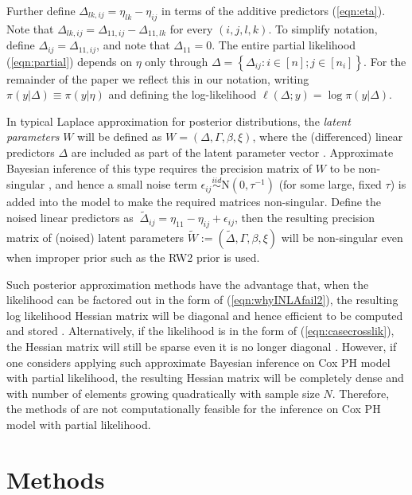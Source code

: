 \documentclass[ba]{imsart}
\begin{document}
Further define $\Delta_{lk,ij} = \eta_{lk} - \eta_{ij}$ in terms of the additive predictors (\ref{eqn:eta}). Note that $\Delta_{lk,ij} = \Delta_{11,ij} - \Delta_{11,lk}$ for every $(i,j,l,k)$. To simplify notation, define $\Delta_{ij} = \Delta_{11,ij}$, and note that $\Delta_{11} = 0$. The entire partial likelihood (\ref{eqn:partial}) depends on $\eta$ only through  $\Delta = \left\{\Delta_{ij}: i \in [n]; j \in [n_{i}] \right\}$. For the remainder of the paper we reflect this in our notation, writing $\pi(y|\Delta) \equiv \pi(y|\eta)$ and defining the log-likelihood $\ell(\Delta; y) = \log\pi(y|\Delta)$.

In typical Laplace approximation for posterior distributions, the \textit{latent parameters} $W$ will be defined as $W = \left(\Delta, \Gamma,\beta, \xi \right)$, where the (differenced) linear predictors $\Delta$ are included as part of the latent parameter vector \citep{inla,inlacoxph,casecross}. Approximate Bayesian inference of this type requires the precision matrix of $W$ to be non-singular \citep{tierney}, and hence a small noise term $\epsilon_{ij} \stackrel{iid}{\sim} \text{N}(0,\tau^{-1})$ (for some large, fixed $\tau$) is added into the model to make the required matrices non-singular. Define the noised linear predictors as $\ \tilde{\Delta}_{ij} = \eta_{11} - \eta_{ij} + \epsilon_{ij}$, then the resulting precision matrix of (noised) latent parameters $\tilde{W} := (\tilde{\Delta}, \Gamma,\beta, \xi )$ will be non-singular even when improper prior such as the RW2 prior is used.

Such posterior approximation methods have the advantage that, when the likelihood can be factored out in the form of (\ref{eqn:whyINLAfail2}), the resulting log likelihood Hessian matrix will be diagonal and hence efficient to be computed and stored \citep{inla}. Alternatively, if the likelihood is in the form of (\ref{eqn:casecrosslik}), the Hessian matrix will still be sparse even it is no longer diagonal \citep{casecross}. However, if one considers applying such approximate Bayesian inference on Cox PH model with partial likelihood, the resulting Hessian matrix will be completely dense and with number of elements growing quadratically with sample size $N$. Therefore, the methods of \cite{inla,inlacoxph,casecross} are not computationally feasible for the inference on Cox PH model with partial likelihood. 

\section{Methods}\label{sec:method}
\end{document}

